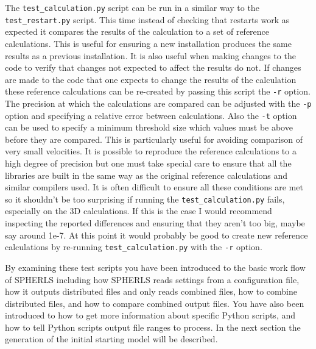 \documentclass[12pt,a4paper]{book}
\begin{document}
The {\tt test\_calculation.py} script can be run in a similar way to the {\tt test\_restart.py} script. This time instead of checking that restarts work as expected it compares the results of the calculation to a set of reference calculations. This is useful for ensuring a new installation produces the same results as a previous installation. It is also useful when making changes to the code to verify that changes not expected to affect the results do not. If changes are made to the code that one expects to change the results of the calculation these reference calculations can be re-created by passing this script the {\tt -r} option. The precision at which the calculations are compared can be adjusted with the {\tt -p} option and specifying a relative error between calculations. Also the {\tt -t} option can be used to specify a minimum threshold size which values must be above before they are compared. This is particularly useful for avoiding comparison of very small velocities. It is possible to reproduce the reference calculations to a high degree of precision but one must take special care to ensure that all the libraries are built in the same way as the original reference calculations and similar compilers used. It is often difficult to ensure all these conditions are met so it shouldn't be too surprising if running the {\tt test\_calculation.py} fails, especially on the 3D calculations. If this is the case I would recommend inspecting the reported differences and ensuring that they aren't too big, maybe say around 1e-7. At this point it would probably be good to create new reference calculations by re-running {\tt test\_calculation.py} with the {\tt -r} option.

By examining these test scripts you have been introduced to the basic work flow of SPHERLS including how SPHERLS reads settings from a configuration file, how it outputs distributed files and only reads combined files, how to combine distributed files, and how to compare combined output files. You have also been introduced to how to get more information about specific Python scripts, and how to tell Python scripts output file ranges to process. In the next section the generation of the initial starting model will be described.
\end{document}
